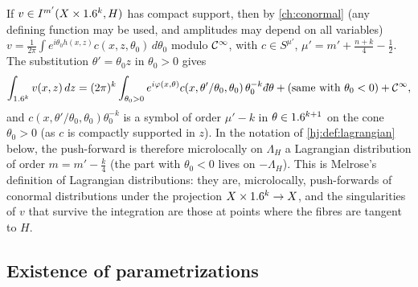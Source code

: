 \begin{remark}\label{hj:rem:pushforward}
  If $v\in I^{m'}(X\times1.6^k,H)$ has compact support, then by
  \cref{ch:conormal} (any defining function may be used, and amplitudes may
  depend on all variables) $v=\frac1{2\pi}\int e^{i\theta_0h(x,z)}
  c(x,z,\theta_0)\,d\theta_0$ modulo $\mathcal{C}^\infty$, with $c\in S^{\mu'}$,
  $\mu'=m'+\frac{n+k}4-\frac12$.  The substitution $\theta'=\theta_0z$ in
  $\theta_0>0$ gives
  \begin{equation*}
    \int_{\R^k}v(x,z)\,dz=(2\pi)^k\int_{\theta_0>0}e^{i\varphi(x,\theta)}
    c(x,\theta'/\theta_0,\theta_0)\,\theta_0^{-k}\,\dbar\theta+(\text{same with }
    \theta_0<0)+\CI,
  \end{equation*}
  and $c(x,\theta'/\theta_0,\theta_0)\theta_0^{-k}$ is a symbol of order
  $\mu'-k$ in $\theta\in1.6^{k+1}$ on the cone $\theta_0>0$ (as $c$ is compactly
  supported in $z$).  In the notation of \cref{hj:def:lagrangian} below, the
  push-forward is therefore microlocally on $\Lambda_H$ a Lagrangian
  distribution of order $m=m'-\frac k4$ (the part with $\theta_0<0$ lives on
  $-\Lambda_H$).  This is Melrose's definition of Lagrangian distributions:
  they are, microlocally, push-forwards of conormal distributions under the
  projection $X\times1.6^k\to X$, and the singularities of $v$ that survive the
  integration are those at points where the fibres are tangent to $H$.
\end{remark}

\subsection{Existence of parametrizations}

